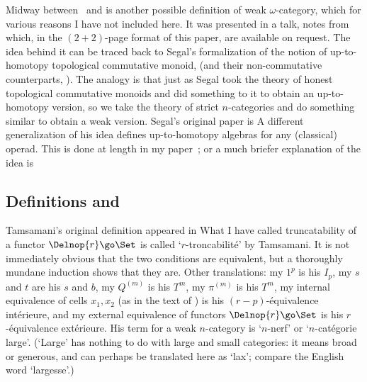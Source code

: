 Midway between \lp\ and  is another possible definition of weak
$\omega$-category, which for various reasons I have not included here.  It
was presented in a talk,
% 
%
% 
notes from which, in the $(2+2)$-page format of this paper, are available on
request.  The idea behind it can be traced back to Segal's formalization of
the notion of up-to-homotopy topological commutative monoid,  (and their non-commutative counterparts, ).  The analogy is that just as Segal took the theory of
honest topological commutative monoids and did something to it to obtain an
up-to-homotopy version, so we take the theory of strict $n$-categories and do
something similar to obtain a weak version.  Segal's original paper is
% 
%
% 
A different generalization of his idea defines up-to-homotopy algebras for
any (classical) operad.  This is done at length in my
paper~; or a much briefer explanation of the idea is
% 
%
% 




\subsection*{Definitions  and }

Tamsamani's original definition appeared in
% 
%
% 
What I have called truncatability of a functor $\Delnop{r} \go \Set$ is
called `$r$-troncabilit\'e' by Tamsamani.  It is not immediately obvious that
the two conditions are equivalent, but a thoroughly mundane induction shows
that they are.  Other translations: my $1^p$ is his $I_p$, my $s$ and $t$ are
his $s$ and $b$, my $Q^{(m)}$ is his $T^m$, my $\pi^{(m)}$ is his $T^m$, my
internal equivalence of cells $x_1, x_2$ (as in the text of ) is his
$(r-p)$-\'equivalence int\'erieure, and my external equivalence of functors
$\Delnop{r} \go \Set$ is his $r$-\'equivalence ext\'erieure.  His term for a
weak $n$-category is `$n$-nerf' or `$n$-cat\'egorie large'.  (`Large' has
nothing to do with large and small categories: it means broad or generous,
and can perhaps be translated here as `lax'; compare the English word
`largesse'.)

